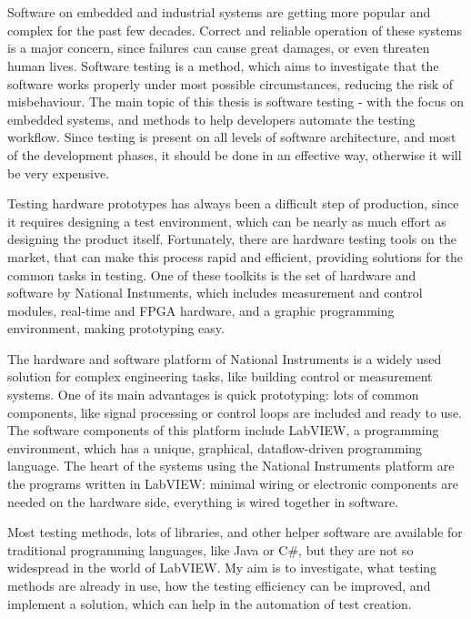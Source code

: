 \chapter{\bevezetes}
\label{chap:introduction}

Software on embedded and industrial systems are getting more popular and complex for the past few decades. Correct and reliable operation of these systems is a major concern, since failures can cause great damages, or even threaten human lives. Software testing is a method, which aims to investigate that the software works properly under most possible circumstances, reducing the risk of misbehaviour.
The main topic of this thesis is software testing - with the focus on embedded systems, and methods to help developers automate the testing workflow. Since testing is present on all levels of software architecture, and most of the development phases, it should be done in an effective way, otherwise it will be very expensive. 

Testing hardware prototypes has always been a difficult step of production, since it requires designing a test environment, which can be nearly as much effort as designing the product itself. Fortunately, there are hardware testing tools on the market, that can make this process rapid and efficient, providing solutions for the common tasks in testing. One of these toolkits is the set of hardware and software by National Instuments, which includes measurement and control modules, real-time and FPGA hardware, and a graphic programming environment, making prototyping easy.

The hardware and software platform of National Instruments is a widely used solution for complex engineering tasks, like building control or measurement systems. One of its main advantages is quick prototyping: lots of common components, like signal processing or control loops are included and ready to use. The software components of this platform include LabVIEW, a programming environment, which has a unique, graphical, dataflow-driven programming language. The heart of the systems using the National Instruments platform are the programs written in LabVIEW: minimal wiring or electronic components are needed on the hardware side, everything is wired together in software.

Most testing methods, lots of libraries, and other helper software are available for traditional programming languages, like Java or C\#, but they are not so widespread in the world of LabVIEW. My aim is to investigate, what testing methods are already in use, how the testing efficiency can be improved, and implement a solution, which can help in the automation of test creation.
